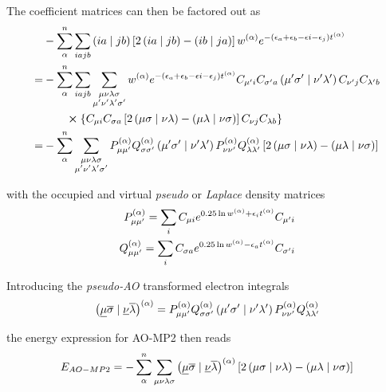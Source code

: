 \noindent The coefficient matrices can then be factored out as
\begin{equation}
\begin{split}
&- \sum_{\alpha}^n \sum_{iajb} \left( ia \mid jb \right) \left[2 \left( ia \mid jb \right) - \left( ib \mid ja \right) \right] w^{(\alpha)} e^{-\left(\epsilon_a + \epsilon_b - \epsilon i - \epsilon_j\right)t^{(\alpha)}} \\
= &- \sum_{\alpha}^n \sum_{iajb} \sum_{\substack{\mu\nu\lambda\sigma \\ \mu'\nu'\lambda'\sigma'} } w^{(\alpha)} e^{-\left(\epsilon_a + \epsilon_b - \epsilon i - \epsilon_j\right)t^{(\alpha)}} C_{\mu' i} C_{\sigma' a} \left( \mu'\sigma' \mid \nu'\lambda' \right) C_{\nu' j} C_{\lambda' b} \\ 
 & \qquad \cross \left\lbrace C_{\mu i} C_{\sigma a} \left [ 2\left( \mu\sigma \mid \nu\lambda \right) -  \left( \mu\lambda \mid \nu\sigma \right) \right] C_{\nu j} C_{\lambda b} \right\rbrace  \\
= & - \sum_{\alpha}^n \sum_{\substack{\mu\nu\lambda\sigma \\ \mu'\nu'\lambda'\sigma'}} P^{(\alpha)}_{\mu\mu'} Q^{(\alpha)}_{\sigma\sigma'} \left( \mu'\sigma' \mid \nu'\lambda' \right) P^{(\alpha)}_{\nu\nu'} Q^{(\alpha)}_{\lambda\lambda'} \left [ 2\left( \mu\sigma \mid \nu\lambda \right) -  \left( \mu\lambda \mid \nu\sigma \right) \right] 
\end{split}
\end{equation}

\noindent with the occupied and virtual \emph{pseudo} or \emph{Laplace} density matrices 
\begin{equation}
\begin{split}
P^{(\alpha)}_{\mu\mu'} = \sum_i C_{\mu i} e^{0.25 \ln w^{(\alpha)} + \epsilon_i t^{(\alpha)}} C_{\mu' i} \\
Q^{(\alpha)}_{\mu\mu'} = \sum_i C_{\sigma a} e^{0.25 \ln w^{(\alpha)} - \epsilon_a t^{(\alpha)}} C_{\sigma' i}
\end{split}
\end{equation}

\noindent Introducing the \emph{pseudo-AO} transformed electron integrals
\begin{equation}
\left( \underline{\mu}\overline{\sigma} \mid \underline{\nu}\overline{\lambda} \right)^{(\alpha)} = P^{(\alpha)}_{\mu\mu'} Q^{(\alpha)}_{\sigma\sigma'} \left( \mu'\sigma' \mid \nu'\lambda' \right) P^{(\alpha)}_{\nu\nu'} Q^{(\alpha)}_{\lambda\lambda'}
\label{eq:PSEUDOAOINTS}
\end{equation}

\noindent the energy expression for AO-MP2 then reads
\begin{equation}
E_{AO-MP2} = - \sum_{\alpha}^n \sum_{\mu\nu\lambda\sigma} \left( \underline{\mu}\overline{\sigma} \mid \underline{\nu}\overline{\lambda} \right)^{(\alpha)} \left [ 2\left( \mu\sigma \mid \nu\lambda \right) -  \left( \mu\lambda \mid \nu\sigma \right) \right]
\label{eq:AOMP2ENERGY}
\end{equation}

